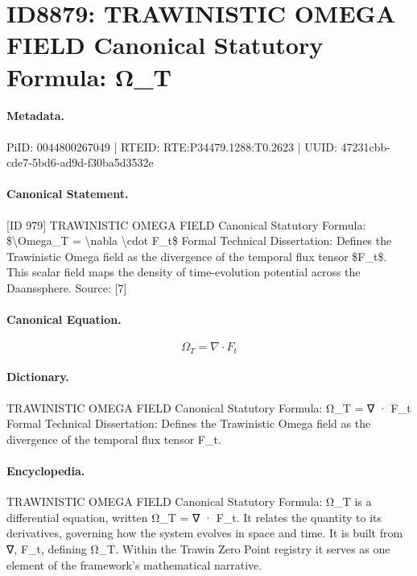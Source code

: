 \section*{ID8879: TRAWINISTIC OMEGA FIELD Canonical Statutory Formula: Ω\_T}
\paragraph{Metadata.}
PiID: 0044800267049 | RTEID: RTE:P34479.1288:T0.2623 | UUID: 47231cbb-cde7-5bd6-ad9d-f30ba5d3532e

\paragraph{Canonical Statement.}
[ID 979] TRAWINISTIC OMEGA FIELD Canonical Statutory Formula: \$\textbackslash{}Omega\_T = \textbackslash{}nabla \textbackslash{}cdot F\_t\$ Formal Technical Dissertation: Defines the Trawinistic Omega field as the divergence of the temporal flux tensor \$F\_t\$. This scalar field maps the density of time-evolution potential across the Daanssphere. Source: [7]

\paragraph{Canonical Equation.}
\[
\Omega_T = \nabla \cdot F_t
\]

\paragraph{Dictionary.}
TRAWINISTIC OMEGA FIELD Canonical Statutory Formula: Ω\_T = ∇ · F\_t Formal Technical Dissertation: Defines the Trawinistic Omega field as the divergence of the temporal flux tensor F\_t.

\paragraph{Encyclopedia.}
TRAWINISTIC OMEGA FIELD Canonical Statutory Formula: Ω\_T is a differential equation, written Ω\_T = ∇ · F\_t. It relates the quantity to its derivatives, governing how the system evolves in space and time. It is built from ∇, F\_t, defining Ω\_T. Within the Trawin Zero Point registry it serves as one element of the framework's mathematical narrative.
